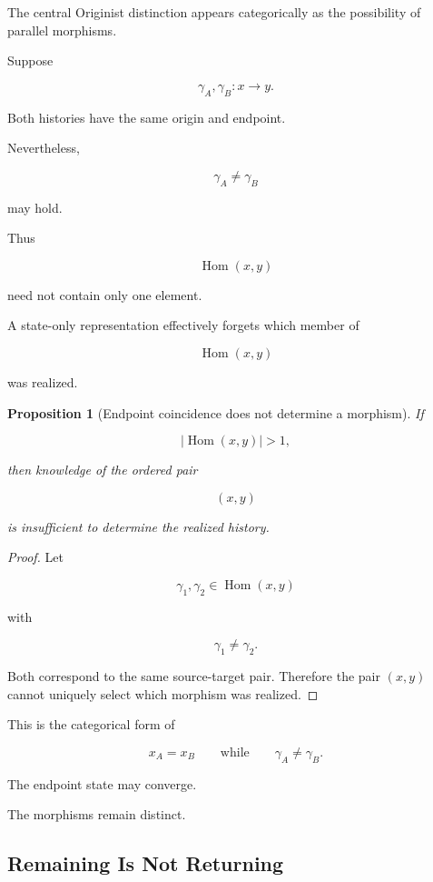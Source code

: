 \documentclass[
  11pt,
  a4paper,
  DIV=12,
  BCOR=0mm,
  parskip=half-
]{scrartcl}
\newcommand{\Hom}{\operatorname{Hom}}
\theoremstyle{definition}
\theoremstyle{plain}
\newtheorem{proposition}[definition]{Proposition}
\theoremstyle{remark}
\begin{document}
The central Originist distinction appears categorically as the possibility of
parallel morphisms.

Suppose

\[
  \gamma_A,\gamma_B:x\to y.
\]

Both histories have the same origin and endpoint.

Nevertheless,

\[
  \gamma_A\neq\gamma_B
\]

may hold.

Thus

\[
  \Hom(x,y)
\]

need not contain only one element.

A state-only representation effectively forgets which member of

\[
  \Hom(x,y)
\]

was realized.

\begin{proposition}[Endpoint coincidence does not determine a morphism]
\label{prop:endpoint-not-morphism}
If

\[
  |\Hom(x,y)|>1,
\]

then knowledge of the ordered pair

\[
  (x,y)
\]

is insufficient to determine the realized history.
\end{proposition}

\begin{proof}
Let

\[
  \gamma_1,\gamma_2\in\Hom(x,y)
\]

with

\[
  \gamma_1\neq\gamma_2.
\]

Both correspond to the same source-target pair. Therefore the pair \((x,y)\)
cannot uniquely select which morphism was realized.
\end{proof}

This is the categorical form of

\[
  x_A=x_B
  \qquad\text{while}\qquad
  \gamma_A\neq\gamma_B.
\]

The endpoint state may converge.

The morphisms remain distinct.


\subsection{Remaining Is Not Returning}
\label{app:identity-vs-return}
\end{document}
